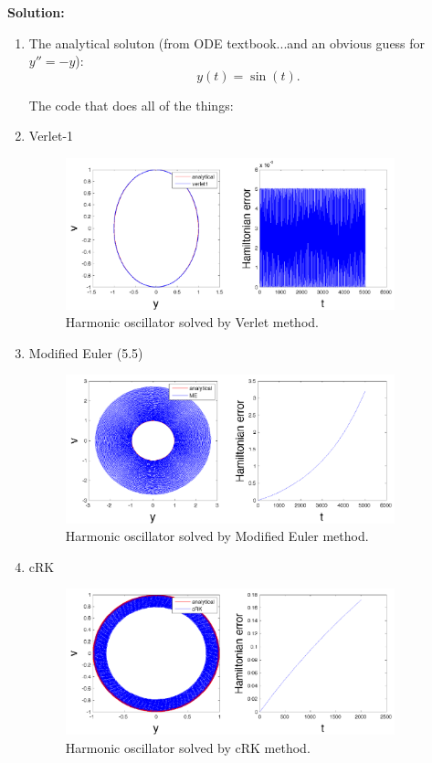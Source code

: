 \documentclass[11pt]{article}
\begin{document}
\begin{enumerate}
\bigskip
\textbf{Solution:}
\begin{enumerate}
\item The analytical soluton (from ODE textbook...and an obvious guess for $y'' = -y$):
\[ y(t) = \sin (t) .\]

The code that does all of the things:


\item Verlet-1

\begin{figure}[h!]
  \centering
    \includegraphics[width=0.9\textwidth]{andy_hw05_prb06_01.pdf}
  \caption{Harmonic oscillator solved by Verlet method.}
\end{figure}


\item Modified Euler (5.5)

\begin{figure}[h!]
  \centering
    \includegraphics[width=0.9\textwidth]{andy_hw05_prb06_02.pdf}
  \caption{Harmonic oscillator solved by Modified Euler method.}
\end{figure}

\item cRK

\begin{figure}[h!]
  \centering
    \includegraphics[width=0.9\textwidth]{andy_hw05_prb06_03.pdf}
  \caption{Harmonic oscillator solved by cRK method.}
\end{figure}


\end{enumerate}
\end{enumerate}
\end{document}
